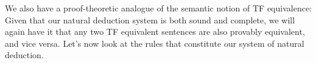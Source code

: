 We also have a proof-theoretic analogue of the semantic notion of TF equivalence:
Given that our natural deduction system is both sound and complete, we will again have it that any two TF equivalent sentences are also provably equivalent, and vice versa.  Let's now look at the rules that constitute our system of natural deduction.



 



%
%
%

